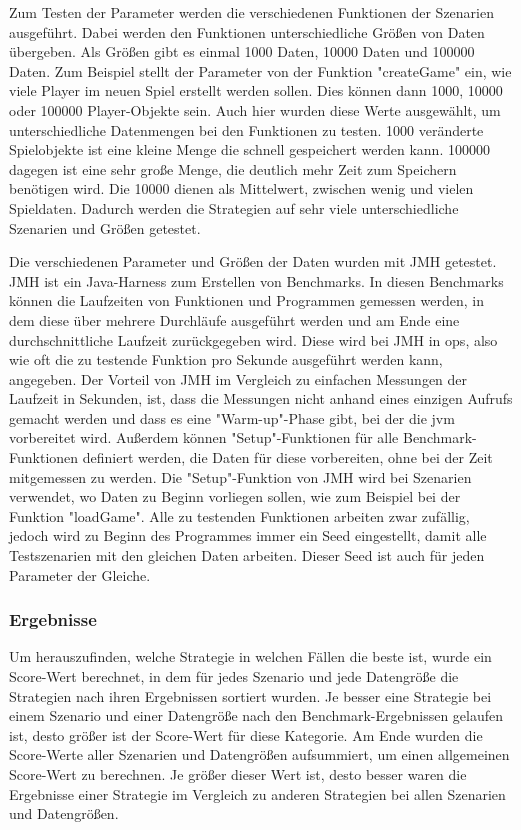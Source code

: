 Zum Testen der Parameter werden die verschiedenen Funktionen der Szenarien ausgeführt. Dabei werden den Funktionen unterschiedliche Größen von Daten übergeben. Als Größen gibt es einmal 1000 Daten, 10000 Daten und 100000 Daten. Zum Beispiel stellt der Parameter von der Funktion "createGame" ein, wie viele Player im neuen Spiel erstellt werden sollen. Dies können dann 1000, 10000 oder 100000 Player-Objekte sein. Auch hier wurden diese Werte ausgewählt, um unterschiedliche Datenmengen bei den Funktionen zu testen. 1000 veränderte Spielobjekte ist eine kleine Menge die schnell gespeichert werden kann. 100000 dagegen ist eine sehr große Menge, die deutlich mehr Zeit zum Speichern benötigen wird. Die 10000 dienen als Mittelwert, zwischen wenig und vielen Spieldaten. Dadurch werden die Strategien auf sehr viele unterschiedliche Szenarien und Größen getestet.

Die verschiedenen Parameter und Größen der Daten wurden mit JMH getestet.\cite{githubGitHubOpenjdkjmh} 
JMH ist ein Java-Harness zum Erstellen von Benchmarks. In diesen Benchmarks können die Laufzeiten von Funktionen und Programmen gemessen werden, in dem diese über mehrere Durchläufe ausgeführt werden und am Ende eine durchschnittliche Laufzeit zurückgegeben wird. Diese wird bei JMH in \ac{ops}, also wie oft die zu testende Funktion pro Sekunde ausgeführt werden kann, angegeben.\cite{githubGitHubOpenjdkjmh} Der Vorteil von JMH im Vergleich zu einfachen Messungen der Laufzeit in Sekunden, ist, dass die Messungen nicht anhand eines einzigen Aufrufs gemacht werden und dass es eine "Warm-up"-Phase gibt, bei der die \ac{jvm} vorbereitet wird. Außerdem können "Setup"-Funktionen für alle Benchmark-Funktionen definiert werden, die Daten für diese vorbereiten, ohne bei der Zeit mitgemessen zu werden. Die "Setup"-Funktion von JMH wird bei Szenarien verwendet, wo Daten zu Beginn vorliegen sollen, wie zum Beispiel bei der Funktion "loadGame". Alle zu testenden Funktionen arbeiten zwar zufällig, jedoch wird zu Beginn des Programmes immer ein Seed eingestellt, damit alle Testszenarien mit den gleichen Daten arbeiten. Dieser Seed ist auch für jeden Parameter der Gleiche.

\subsubsection{Ergebnisse}
Um herauszufinden, welche Strategie in welchen Fällen die beste ist, wurde ein Score-Wert berechnet, in dem für jedes Szenario und jede Datengröße die Strategien nach ihren Ergebnissen sortiert wurden. Je besser eine Strategie bei einem Szenario und einer Datengröße nach den Benchmark-Ergebnissen gelaufen ist, desto größer ist der Score-Wert für diese Kategorie. Am Ende wurden die Score-Werte aller Szenarien und Datengrößen aufsummiert, um einen allgemeinen Score-Wert zu berechnen. Je größer dieser Wert ist, desto besser waren die Ergebnisse einer Strategie im Vergleich zu anderen Strategien bei allen Szenarien und Datengrößen. 

